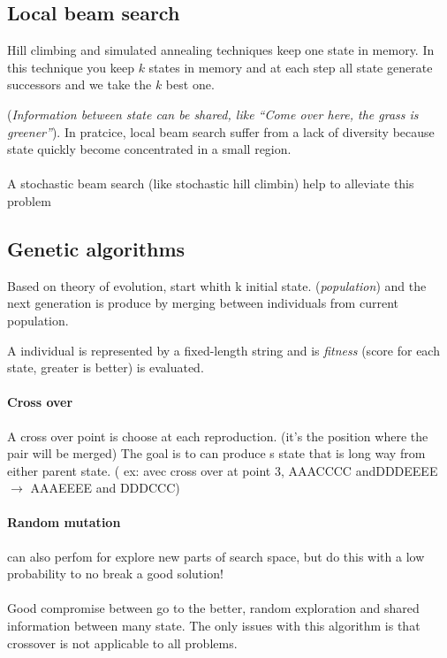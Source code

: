 \subsection{Local beam search}

Hill climbing and simulated annealing techniques keep one state in memory. 
In this technique you keep $k$ states in memory and at each step all state 
generate successors and we take the $k$ best one.

(\textit{Information between state can be shared, like
``Come over here, the grass is greener''}).
In pratcice, local beam search suffer from a lack of diversity because
state quickly become concentrated in a small region.


\paragraph{ } A stochastic beam search (like stochastic hill climbin)
help to alleviate this problem


\subsection{Genetic algorithms}  

Based on theory  of  evolution, start  whith  k initial  state.
(\textit{population})  and the  next  generation is  produce by  merging
between individuals from current population. 

A individual is represented by a fixed-length string and is \textit{fitness}
(score for each state, greater is better) is evaluated.

\paragraph{Cross over} A cross over point is choose at each reproduction. (it's the position where
the pair will be merged)
The goal is to can produce s state that is long way from either parent state.
( ex: avec cross over at point 3, AAACCCC andDDDEEEE $\to$ AAAEEEE and DDDCCC)


\paragraph{Random mutation } can also perfom for explore new parts of
search space, but do this with a low probability to no break a good solution!


\paragraph{ } 
Good compromise between go to the better, random exploration and shared information
between many state.
The only issues with this algorithm is that crossover is not applicable to all problems.


